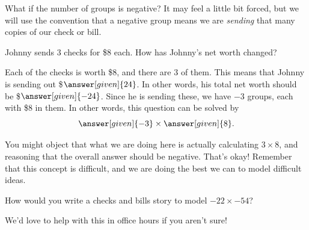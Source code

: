 \documentclass{ximera}
\begin{document}
What if the number of groups is negative?  It may feel a little bit forced, but we will use the convention that a negative group means we are {\em sending} that many copies of our check or bill.  

\begin{example}
Johnny sends $3$ checks for \$$8$ each.  How has Johnny's net worth changed?

\begin{explanation}
Each of the checks is worth \$$8$, and there are $3$ of them.  This means that Johnny is sending out \$$\answer[given]{24}$.  In other words, his total net worth should be \$$\answer[given]{-24}$.  Since he is sending these, we have $-3$ groups, each with \$$8$ in them. In other words, this question can be solved by
\[
     \answer[given]{-3} \times \answer[given]{8}.
\]
\end{explanation}
\end{example}

%
You might object that what we are doing here is actually calculating $3 \times 8$, and reasoning that the overall answer should be negative.  That's okay!  Remember that this concept is difficult, and we are doing the best we can to model difficult ideas.

\begin{question}
How would you write a checks and bills story to model $-22 \times -54$?
\begin{freeResponse}
We'd love to help with this in office hours if you aren't sure!
\end{freeResponse}
\end{question}

%
%
\end{document}
